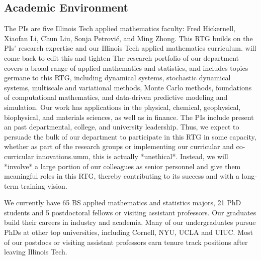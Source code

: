 \documentclass[11pt]{NSFamsart}
\newcommand{\numUG}{65\xspace}
\newcommand{\numPhD}{21\xspace}
\newcommand{\numPostDoc}{5\xspace}
\begin{document}
\subsection*{Academic Environment} The PIs are five Illinois Tech applied mathematics faculty:  %
Fred Hickernell, Xiaofan Li, Chun Liu, Sonja Petrovi\'c, and Ming Zhong. This RTG builds on the PIs' research expertise and our Illinois Tech applied mathematics curriculum. {\color{magenta}will come back to edit this and tighten}  The research portfolio of our department covers a broad range of applied mathematics and statistics, and includes topics germane to this RTG, including dynamical systems, stochastic dynamical systems, multiscale and variational methods,  Monte Carlo methods, foundations of computational mathematics, and data-driven predictive modeling and simulation. Our work has applications in the physical, chemical, geophysical, biophysical, and materials sciences, as well as in finance. The PIs include present an past departmental, college, and university leadership.   Thus, we expect to persuade the bulk of our department to participate in this RTG in some capacity, whether as part of the research groups or implementing our curricular and co-curricular innovations.{\color{magenta}umm, this is actually *unethical*. Instead, we will *involve* a large portion of our colleagues as senior personnel and give them meaningful roles in this RTG, thereby contributing to its success and with a long-term training vision.}

 We currently have \numUG BS applied mathematics and statistics majors, \numPhD PhD students and   \numPostDoc postdoctoral fellows or visiting assistant professors. Our graduates build their careers in  industry  and academia. Many of our undergraduates pursue PhDs at other top universities, including Cornell, NYU, UCLA and UIUC. Most of our postdocs or visiting assistant professors earn tenure track positions after leaving Illinois Tech.
\end{document}
